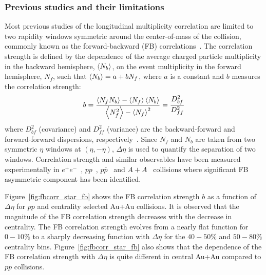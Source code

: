 \subsubsection{Previous studies and their limitations}

Most previous studies of the longitudinal multiplicity correlation are limited to two rapidity windows symmetric around the center-of-mass of the collision, commonly known as the forward-backward (FB) correlations~\cite{Bialas:2010zb}. The correlation strength is defined by the dependence of the average charged particle multiplicity in the backward hemisphere, $\left\langle N_b\right\rangle$, on the event multiplicity in the forward hemisphere, $N_f$, such that $\left\langle N_b\right\rangle = a + b N_f$, where $a$ is a constant and $b$ measures the correlation strength:
\begin{equation}
b = \frac{\left\langle N_f N_b\right\rangle - \left\langle N_f\right\rangle\left\langle N_b\right\rangle}{\left\langle N_f^2\right\rangle - \left\langle N_f\right\rangle^2} = \frac{D_{bf}^2}{D_{ff}^2}
\end{equation}
where $D_{bf}^2$ (covariance) and $D_{ff}^2$ (variance) are the backward-forward and forward-forward dispersions, respectively~\cite{Abelev:2009ag}. Since $N_f$ and $N_b$ are taken from two symmetric $\eta$ windows at $(\eta, -\eta)$, $\Delta\eta$ is used to quantify the separation of two windows. Correlation strength and similar observables have been measured experimentally in $e^+ e^-$~\cite{Braunschweig:1989bp}, $pp$~\cite{Uhlig:1977dc, ATLAS:2012as, Adam:2015mya}, $p\bar{p}$~\cite{Ansorge:1988fg, Alexopoulos:1995ft} and $A+A$~\cite{Abelev:2009ag} collisions where significant FB asymmetric component has been identified.

Figure~\ref{fig:fbcorr_star_fb} shows the FB correlation strength $b$ as a function of $\Delta\eta$ for $pp$ and centrality selected Au+Au collisions. It is observed that the magnitude of the FB correlation strength decreases with the decrease in centrality. The FB correlation strength evolves from a nearly flat function for $0-10\%$ to a sharply decreasing function with $\Delta\eta$ for the $40-50\%$ and $50-80\%$ centrality bins. Figure~\ref{fig:fbcorr_star_fb} also shows that the dependence of the FB correlation strength with $\Delta\eta$ is quite different in central Au+Au compared to $pp$ collisions.

